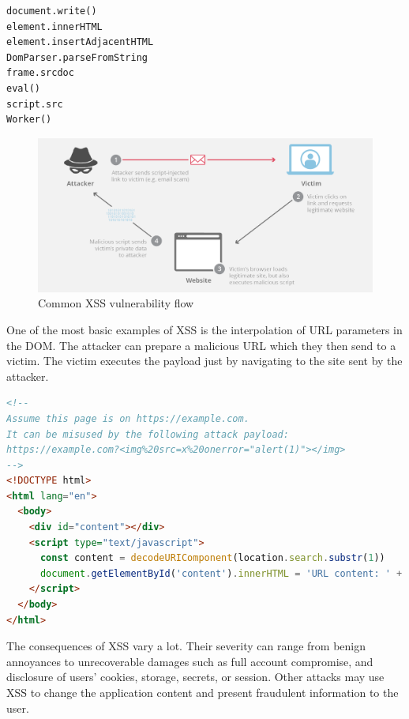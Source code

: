\bigskip
\begin{lstlisting}[language={}, caption=Common DOM XSS sinks \cite{dom_xss_portswigger} \cite{tt_web_framework_paper}]
document.write()
element.innerHTML
element.insertAdjacentHTML
DomParser.parseFromString
frame.srcdoc
eval()
script.src
Worker()
\end{lstlisting}

\begin{figure}[H]
  \centerline{\includegraphics[width=1\textwidth]{images/xss-attack.png}}
  \caption[Common XSS vulnerability flow \cite{xss_image}]{Common XSS vulnerability flow \cite{xss_image}}
  \label{img:xss}
\end{figure}

One of the most basic examples of XSS is the interpolation of URL parameters in the DOM. The
attacker can prepare a malicious URL which they then send to a victim. The victim executes the
payload just by navigating to the site sent by the attacker.

\bigskip
\begin{lstlisting}[language=HTML, caption=Basic example of XSS via unsafe URL parameter interpolation]
<!--
Assume this page is on https://example.com.
It can be misused by the following attack payload:
https://example.com?<img%20src=x%20onerror="alert(1)"></img>
-->
<!DOCTYPE html>
<html lang="en">
  <body>
    <div id="content"></div>
    <script type="text/javascript">
      const content = decodeURIComponent(location.search.substr(1))
      document.getElementById('content').innerHTML = 'URL content: ' + content
    </script>
  </body>
</html>
\end{lstlisting}

The consequences of XSS vary a lot. Their severity can range from benign annoyances to unrecoverable
damages such as full account compromise, and disclosure of users' cookies, storage, secrets, or
session. Other attacks may use XSS to change the application content and present fraudulent
information to the user.

